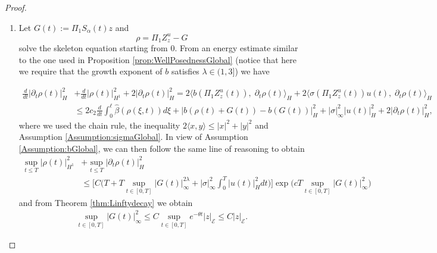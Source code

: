 \documentclass[10pt, reqno]{amsart}
\theoremstyle{definition}
\numberwithin{lem}{section}
\numberwithin{cor}{section}
\numberwithin{prop}{section}
\numberwithin{thm}{section}
\numberwithin{dfn}{section}
\begin{document}
\begin{proof}
\begin{enumerate}
    \item 
Let $G(t):= \Pi_1S_\alpha(t)z$ and
$$\rho=\Pi_1Z^u_{z}-G$$
solve the skeleton equation starting from $0$. From an energy estimate similar to the one used in Proposition \ref{prop:WellPosednessGlobal} (notice that here we require that the growth exponent of $b$ satisfies $\lambda\in(1,3]$) we have 






\begin{equation*}
\begin{aligned}
\frac{d}{dt}\big|\partial_t\rho(t)\big|^2_{H}&+\frac{d}{dt}\big|\rho(t)\big|^2_{H^1}+2\big|\partial_t\rho(t)\big|^2_{H}=2\langle b(\Pi_1Z^u_{z}(t)),\; \partial_t\rho(t)\rangle_{H}+2\langle \sigma(\Pi_1Z^u_{z}(t))u(t),\; \partial_t\rho(t)\rangle_{H}\\&
\leq 2c_2\frac{d}{dt}\int_{0}^{\ell}\hat{\beta}(\rho(\xi, t))d\xi+\big| b(\rho(t)+G(t))-b(G(t)) \big|^2_{H}+|\sigma|^2_\infty|u(t)|^2_{H}+2\big|\partial_t\rho(t)\big|^2_{H},
\end{aligned}
\end{equation*}
where we used the chain rule, the inequality $2\langle x, y\rangle\leq |x|^2+|y|^2$ and Assumption \ref{Assumption:sigmaGlobal}. In view of Assumption \ref{Assumption:bGlobal}, we can then follow the same line of reasoning to obtain 
\begin{equation*}
\begin{aligned}
\sup_{t\leq T}\big|\rho(t)\big|^2_{H^1}&+\sup_{t\leq T}\big|\partial_t\rho(t)\big|^2_{H}\\&\leq \bigg[C\bigg(T+T\sup_{t\in[0,T]}|G(t)|^{2\lambda}_{\infty}+|\sigma|^2_\infty\int_{0}^{T}|u(t)|^2_{H}dt\bigg)\bigg]\exp\big(cT\sup_{t\in[0,T]}|G(t)|^{2}_{\infty}\big)
\end{aligned}
\end{equation*}
and from Theorem \ref{thm:Linftydecay} we obtain
\begin{equation*}
\begin{aligned}
\sup_{t\in[0,T]}|G(t)|^{2}_{\infty}\leq C\sup_{t\in[0,T]}e^{-\theta t}|z|_{\mathcal{E}}\leq C|z|_{\mathcal{E}}.
\end{aligned}
\end{equation*}


\end{enumerate}
\end{proof}
\end{document}
